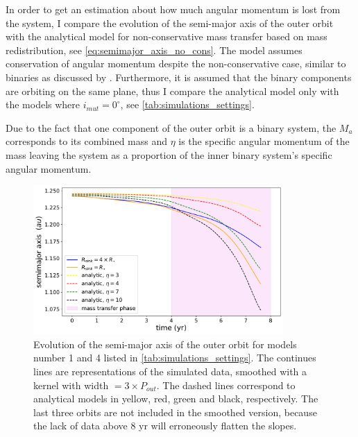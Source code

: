 In order to get an estimation about how much angular momentum is lost from the system, I compare the evolution of the semi-major axis of the outer orbit with the analytical model for non-conservative mass transfer based on mass redistribution, see \cref{eq:semimajor_axis_no_cons}. The model assumes conservation of angular momentum despite the non-conservative case, similar to binaries as discussed by \cite{portegies1995formation}. Furthermore, it is assumed that the binary components are orbiting on the same plane, thus I compare the analytical model only with the models where $i_{mut}=0^{\circ}$, see \cref{tab:simulations_settings}.

Due to the fact that one component of the outer orbit is a binary system, the $M_a$ corresponds to its combined mass and $\eta$ is the specific angular momentum of the mass leaving the system as a proportion of the inner binary system's specific angular momentum. 
\begin{figure}[!htb]
    \centering
    \includegraphics[width=0.85\textwidth]{Thesis/graphs/analytical_model.pdf}
    \caption{Evolution of the semi-major axis of the outer orbit for models number 1 and 4 listed in \cref{tab:simulations_settings}. The continues lines are representations of the simulated data, smoothed with a kernel with width $= 3 \times P_{out}$. The dashed lines correspond to analytical models in yellow, red, green and black, respectively.  The last three orbits are not included in the smoothed version, because the lack of data above $8$ yr will erroneously flatten the slopes.}
    \label{fig:comparison_analytical_model_max}
\end{figure}
